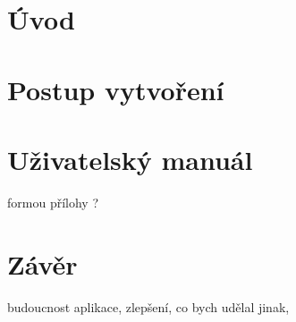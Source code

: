 \documentclass[czech,maturita,a4paper]{diploma}
\begin{document}
\MakeTitlePages

\chapter{Úvod}






\chapter{Postup vytvoření}



\chapter{Uživatelský manuál}
formou přílohy ?

\chapter{Závěr}
budoucnost aplikace, zlepšení, co bych udělal jinak, 

\printbibliography[title={Literatura}]

\newpage
\listoftodos[TODOS]
\end{document}
